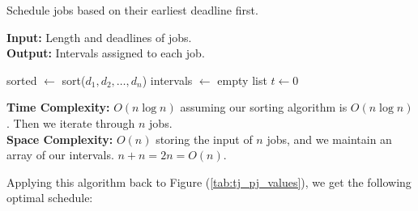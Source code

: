     \newpage 

    \begin{Func}[EarliestDeadlineFirst Algorithm - \texttt{EDF($j = 1 \dots n : t_j, d_j$)}]
        Schedule jobs based on their earliest deadline first.
    
        \vspace{.5em}
        \noindent
        \textbf{Input:} Length and deadlines of jobs.\\
        \textbf{Output:} Intervals assigned to each job.\\
        \begin{algorithm}[H]
            \SetAlgoLined
            sorted $\gets$ sort($d_1, d_2, \dots, d_n$) 
            intervals $\gets$ empty list\;
            $t \gets 0$ 
    
        \end{algorithm}

        \noindent
        \textbf{Time Complexity:} $O(n\log n)$ assuming our sorting algorithm is $O(n\log n)$. Then we iterate through $n$ jobs.\\
        \textbf{Space Complexity:} $O(n)$ storing the input of $n$ jobs, and we maintain an array of our intervals. $n+n=2n=O(n)$.
    \end{Func}
    \noindent
    Applying this algorithm back to Figure (\ref{tab:tj_pj_values}), we get the following optimal schedule:
